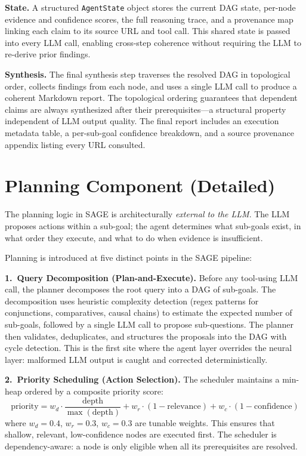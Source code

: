 \documentclass[11pt]{article}
\begin{document}
\textbf{State.} A structured \texttt{AgentState} object stores the current DAG state, per-node evidence and confidence scores, the full reasoning trace, and a provenance map linking each claim to its source URL and tool call. This shared state is passed into every LLM call, enabling cross-step coherence without requiring the LLM to re-derive prior findings.

\textbf{Synthesis.} The final synthesis step traverses the resolved DAG in topological order, collects findings from each node, and uses a single LLM call to produce a coherent Markdown report. The topological ordering guarantees that dependent claims are always synthesized after their prerequisites---a structural property independent of LLM output quality. The final report includes an execution metadata table, a per-sub-goal confidence breakdown, and a source provenance appendix listing every URL consulted.

\section{Planning Component (Detailed)}

\begin{tcolorbox}[boxstyle, title={Core Planning Design}]
The planning logic in SAGE is architecturally \emph{external to the LLM}. The LLM proposes actions within a sub-goal; the agent determines what sub-goals exist, in what order they execute, and what to do when evidence is insufficient.
\end{tcolorbox}

Planning is introduced at five distinct points in the SAGE pipeline:

\textbf{1.\ Query Decomposition (Plan-and-Execute).} Before any tool-using LLM call, the planner decomposes the root query into a DAG of sub-goals. The decomposition uses heuristic complexity detection (regex patterns for conjunctions, comparatives, causal chains) to estimate the expected number of sub-goals, followed by a single LLM call to propose sub-questions. The planner then validates, deduplicates, and structures the proposals into the DAG with cycle detection. This is the first site where the agent layer overrides the neural layer: malformed LLM output is caught and corrected deterministically.

\textbf{2.\ Priority Scheduling (Action Selection).} The scheduler maintains a min-heap ordered by a composite priority score:
\[
\text{priority} = w_d \cdot \frac{\text{depth}}{\max(\text{depth})} + w_r \cdot (1 - \text{relevance}) + w_c \cdot (1 - \text{confidence})
\]
where $w_d = 0.4$, $w_r = 0.3$, $w_c = 0.3$ are tunable weights. This ensures that shallow, relevant, low-confidence nodes are executed first. The scheduler is dependency-aware: a node is only eligible when all its prerequisites are resolved.
\end{document}
